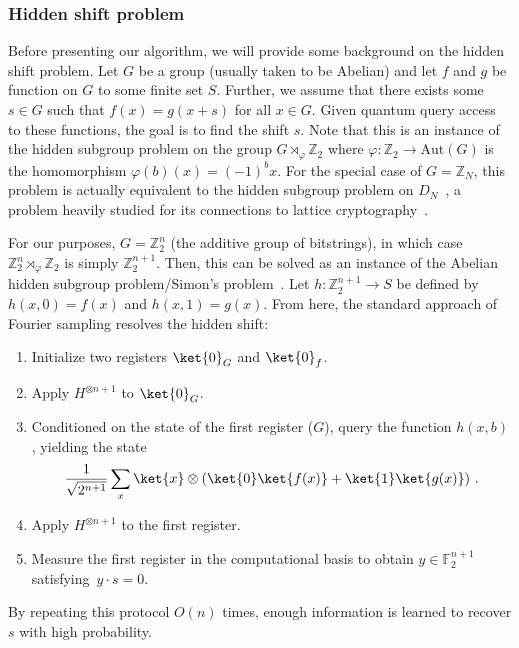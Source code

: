 \documentclass[11pt]{article}
\newcommand{\F}{\mathbb{F}}
\begin{document}
\subsubsection{Hidden shift problem}
Before presenting our algorithm, we will provide some background on the hidden shift problem. Let $G$ be a group (usually taken to be Abelian) and let $f$ and $g$ be function on $G$ to some finite set $S$. Further, we assume that there exists some $s\in G$ such that $f(x) = g(x+s)$ for all $x\in G$. Given quantum query access to these functions, the goal is to find the shift $s$\cite{childs2010quantum,van2006quantum,rotteler2010quantum,kuperberg2005subexponential,ettinger2000quantum}. Note that this is an instance of the hidden subgroup problem on the group $G \rtimes_\varphi \mathbb{Z}_2$ where $\varphi: \mathbb{Z}_2 \rightarrow \text{Aut}(G)$ is the homomorphism $\varphi(b)(x) = (-1)^b x$. For the special case of $G=\mathbb{Z}_N$, this problem is actually equivalent to the hidden subgroup problem on $D_N$~\cite{kuperberg2005subexponential,ettinger2000quantum}, a problem heavily studied for its connections to lattice cryptography~\cite{regev2004quantum}.

For our purposes, $G=\mathbb{Z}_2^n$ (the additive group of bitstrings), in which case $\mathbb{Z}_2^n \rtimes_\varphi \mathbb{Z}_2$ is simply $\mathbb{Z}_2^{n+1}$. Then, this can be solved as an instance of the Abelian hidden subgroup problem/Simon's problem~\cite{simon1997power,lomont2004hidden}. Let $h:\mathbb{Z}_2^{n+1}\rightarrow S$ be defined by $h(x,0) = f(x)$ and $h(x,1)=g(x)$. From here, the standard approach of Fourier sampling resolves the hidden shift:
\begin{enumerate}
    \item Initialize two registers $\ket{0}_G$ and $\ket{0}_f$.
    \item Apply $H^{\otimes n+1}$ to $\ket{0}_G$.
    \item Conditioned on the state of the first register ($G$), query the function $h(x,b)$, yielding the state
    \begin{align}
        \frac{1}{\sqrt{2^{n+1}}}\sum_x \ket{x}\otimes(\ket{0}\ket{f(x)} + \ket{1}\ket{g(x)})\ .
    \end{align}
    \item Apply $H^{\otimes n+1}$ to the first register.
    \item Measure the first register in the computational basis to obtain $y\in \F_2^{n+1}$ satisfying~$y\cdot s = 0$. 
\end{enumerate}
By repeating this protocol $O(n)$ times, enough information is learned to recover $s$ with high probability.
\end{document}

